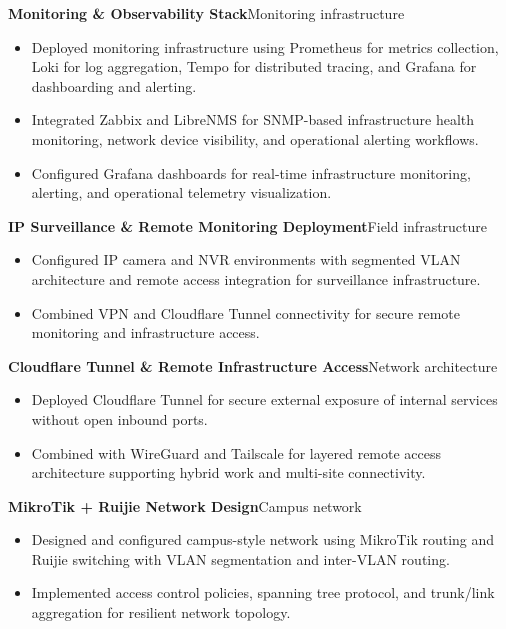 \textbf{Monitoring \& Observability Stack}\hfill {\color{SecondaryText}\small Monitoring infrastructure}\par
\begin{itemize}
  \item Deployed monitoring infrastructure using Prometheus for metrics collection, Loki for log aggregation, Tempo for distributed tracing, and Grafana for dashboarding and alerting.
  \item Integrated Zabbix and LibreNMS for SNMP-based infrastructure health monitoring, network device visibility, and operational alerting workflows.
  \item Configured Grafana dashboards for real-time infrastructure monitoring, alerting, and operational telemetry visualization.
\end{itemize}

\textbf{IP Surveillance \& Remote Monitoring Deployment}\hfill {\color{SecondaryText}\small Field infrastructure}\par
\begin{itemize}
  \item Configured IP camera and NVR environments with segmented VLAN architecture and remote access integration for surveillance infrastructure.
  \item Combined VPN and Cloudflare Tunnel connectivity for secure remote monitoring and infrastructure access.
\end{itemize}

\textbf{Cloudflare Tunnel \& Remote Infrastructure Access}\hfill {\color{SecondaryText}\small Network architecture}\par
\begin{itemize}
  \item Deployed Cloudflare Tunnel for secure external exposure of internal services without open inbound ports.
  \item Combined with WireGuard and Tailscale for layered remote access architecture supporting hybrid work and multi-site connectivity.
\end{itemize}

\textbf{MikroTik + Ruijie Network Design}\hfill {\color{SecondaryText}\small Campus network}\par
\begin{itemize}
  \item Designed and configured campus-style network using MikroTik routing and Ruijie switching with VLAN segmentation and inter-VLAN routing.
  \item Implemented access control policies, spanning tree protocol, and trunk/link aggregation for resilient network topology.
\end{itemize}
